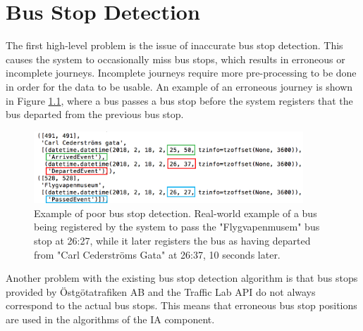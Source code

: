 \chapter{Bus Stop Detection}
\label{cha:bus-stop-detection}

The first high-level problem is the issue of inaccurate bus stop detection.
This causes the system to occasionally miss bus stops, which results in erroneous or incomplete journeys.
Incomplete journeys require more pre-processing to be done in order for the data to be usable.
An example of an erroneous journey is shown in Figure \ref{fig:passed-before-departed}, where a bus passes a bus stop before the system registers that the bus departed from the previous bus stop.

\begin{figure}[ht!]
    \centering
    \includegraphics[width=0.9\textwidth]{figures/bad_timing}
    \caption[Example of poor bus stop detection]%
    {\small Example of poor bus stop detection. Real-world example of a bus being registered by the system to pass the "Flygvapenmusem" bus stop at 26:27,
    while it later registers the bus as having departed from "Carl Cederströms Gata" at 26:37, 10 seconds later.
    }
    \label{fig:passed-before-departed}
\end{figure}

Another problem with the existing bus stop detection algorithm is that bus stops provided by Östgötatrafiken AB and the Traffic Lab API do not always correspond to the actual bus stops.
This means that erroneous bus stop positions are used in the algorithms of the IA component.

